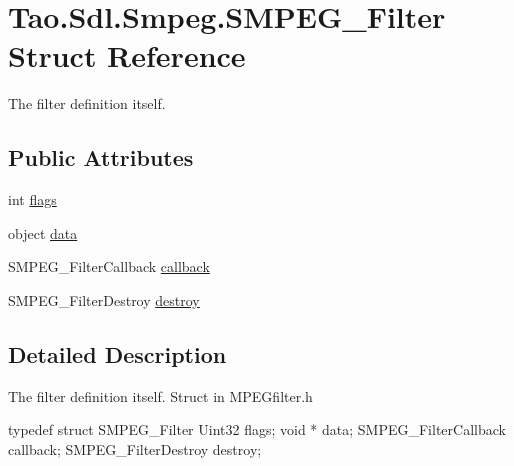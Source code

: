 \hypertarget{struct_tao_1_1_sdl_1_1_smpeg_1_1_s_m_p_e_g___filter}{
\section{Tao.Sdl.Smpeg.SMPEG\_\-Filter Struct Reference}
\label{struct_tao_1_1_sdl_1_1_smpeg_1_1_s_m_p_e_g___filter}
}


The filter definition itself.  


\subsection*{Public Attributes}
\begin{DoxyCompactItemize}
\item 
int \hyperlink{struct_tao_1_1_sdl_1_1_smpeg_1_1_s_m_p_e_g___filter_a3c583eca1c4a47e8908a565382bfde9e}{flags}
\item 
object \hyperlink{struct_tao_1_1_sdl_1_1_smpeg_1_1_s_m_p_e_g___filter_a82ef4198a1b181e72f68cf47c4699f13}{data}
\item 
SMPEG\_\-FilterCallback \hyperlink{struct_tao_1_1_sdl_1_1_smpeg_1_1_s_m_p_e_g___filter_a5b5d470674ea23833cca1917d63dc220}{callback}
\item 
SMPEG\_\-FilterDestroy \hyperlink{struct_tao_1_1_sdl_1_1_smpeg_1_1_s_m_p_e_g___filter_a13cbd131078d63547eb940ac7eb6f794}{destroy}
\end{DoxyCompactItemize}


\subsection{Detailed Description}
The filter definition itself. Struct in MPEGfilter.h 
\begin{DoxyCode}
                    typedef struct SMPEG_Filter {
                                Uint32 flags;
                                void * data;
                                SMPEG_FilterCallback callback;
                                SMPEG_FilterDestroy destroy;
                        }
\end{DoxyCode}
 

